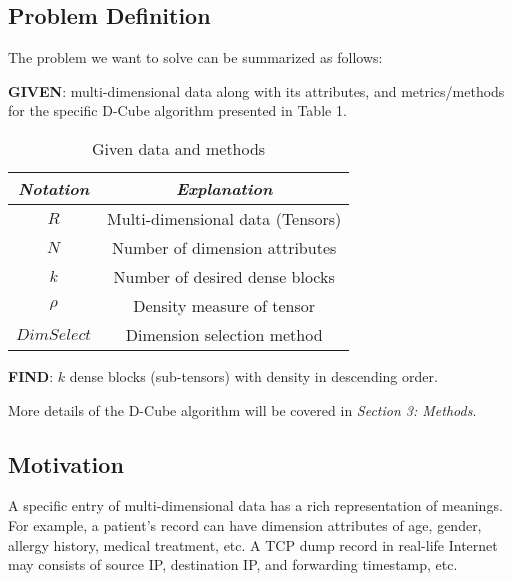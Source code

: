 \subsection{Problem Definition}

The problem we want to solve can be summarized as follows:
\bit
\setlength\itemsep{1em}
\item \textbf{GIVEN}: multi-dimensional data along with its attributes, and metrics/methods for the specific D-Cube algorithm presented in Table 1.

\begin{table}[]
\centering
\caption{Given data and methods}
\label{my-label}
\begin{tabular}{cc}
\hline
\textit{\textbf{Notation}}    & \textit{\textbf{Explanation}}                \\ \hline
\textit{\textbf{$R$}}         & Multi-dimensional data (Tensors)             \\ \hline
\textit{\textbf{$N$}}         & Number of dimension attributes               \\ \hline
\textit{\textbf{$k$}}         & Number of desired dense blocks               \\ \hline
\textit{\textbf{$\rho$}}      & Density measure of tensor                    \\ \hline
\textit{\textbf{$DimSelect$}} & Dimension selection method                   \\ \hline
\end{tabular}
\end{table}

\item \textbf{FIND}: $k$ dense blocks (sub-tensors) with density in descending order.
\eit

More details of the D-Cube algorithm will be covered in \textit{Section 3: Methods}. 

\subsection{Motivation}

A specific entry of multi-dimensional data has a rich representation of meanings. For example, a patient's record can have dimension attributes of age, gender, allergy history, medical treatment, etc. A TCP dump record in real-life Internet may consists of source IP, destination IP, and forwarding timestamp, etc. \\

